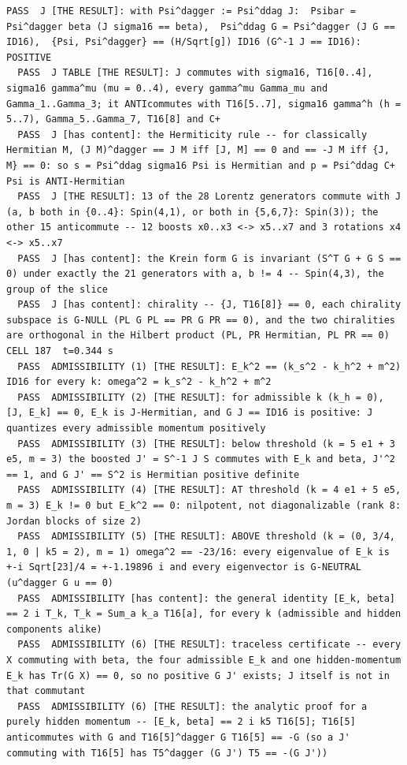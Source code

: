 \begin{Verbatim}[fontsize=\scriptsize]
  PASS  J [THE RESULT]: with Psi^dagger := Psi^ddag J:  Psibar = Psi^dagger beta (J sigma16 == beta),  Psi^ddag G = Psi^dagger (J G == ID16),  {Psi, Psi^dagger} == (H/Sqrt[g]) ID16 (G^-1 J == ID16): POSITIVE
  PASS  J TABLE [THE RESULT]: J commutes with sigma16, T16[0..4], sigma16 gamma^mu (mu = 0..4), every gamma^mu Gamma_mu and Gamma_1..Gamma_3; it ANTIcommutes with T16[5..7], sigma16 gamma^h (h = 5..7), Gamma_5..Gamma_7, T16[8] and C+
  PASS  J [has content]: the Hermiticity rule -- for classically Hermitian M, (J M)^dagger == J M iff [J, M] == 0 and == -J M iff {J, M} == 0: so s = Psi^ddag sigma16 Psi is Hermitian and p = Psi^ddag C+ Psi is ANTI-Hermitian
  PASS  J [THE RESULT]: 13 of the 28 Lorentz generators commute with J (a, b both in {0..4}: Spin(4,1), or both in {5,6,7}: Spin(3)); the other 15 anticommute -- 12 boosts x0..x3 <-> x5..x7 and 3 rotations x4 <-> x5..x7
  PASS  J [has content]: the Krein form G is invariant (S^T G + G S == 0) under exactly the 21 generators with a, b != 4 -- Spin(4,3), the group of the slice
  PASS  J [has content]: chirality -- {J, T16[8]} == 0, each chirality subspace is G-NULL (PL G PL == PR G PR == 0), and the two chiralities are orthogonal in the Hilbert product (PL, PR Hermitian, PL PR == 0)
CELL 187  t=0.344 s
  PASS  ADMISSIBILITY (1) [THE RESULT]: E_k^2 == (k_s^2 - k_h^2 + m^2) ID16 for every k: omega^2 = k_s^2 - k_h^2 + m^2
  PASS  ADMISSIBILITY (2) [THE RESULT]: for admissible k (k_h = 0), [J, E_k] == 0, E_k is J-Hermitian, and G J == ID16 is positive: J quantizes every admissible momentum positively
  PASS  ADMISSIBILITY (3) [THE RESULT]: below threshold (k = 5 e1 + 3 e5, m = 3) the boosted J' = S^-1 J S commutes with E_k and beta, J'^2 == 1, and G J' == S^2 is Hermitian positive definite
  PASS  ADMISSIBILITY (4) [THE RESULT]: AT threshold (k = 4 e1 + 5 e5, m = 3) E_k != 0 but E_k^2 == 0: nilpotent, not diagonalizable (rank 8: Jordan blocks of size 2)
  PASS  ADMISSIBILITY (5) [THE RESULT]: ABOVE threshold (k = (0, 3/4, 1, 0 | k5 = 2), m = 1) omega^2 == -23/16: every eigenvalue of E_k is +-i Sqrt[23]/4 = +-1.19896 i and every eigenvector is G-NEUTRAL (u^dagger G u == 0)
  PASS  ADMISSIBILITY [has content]: the general identity [E_k, beta] == 2 i T_k, T_k = Sum_a k_a T16[a], for every k (admissible and hidden components alike)
  PASS  ADMISSIBILITY (6) [THE RESULT]: traceless certificate -- every X commuting with beta, the four admissible E_k and one hidden-momentum E_k has Tr(G X) == 0, so no positive G J' exists; J itself is not in that commutant
  PASS  ADMISSIBILITY (6) [THE RESULT]: the analytic proof for a purely hidden momentum -- [E_k, beta] == 2 i k5 T16[5]; T16[5] anticommutes with G and T16[5]^dagger G T16[5] == -G (so a J' commuting with T16[5] has T5^dagger (G J') T5 == -(G J'))

\end{Verbatim}
